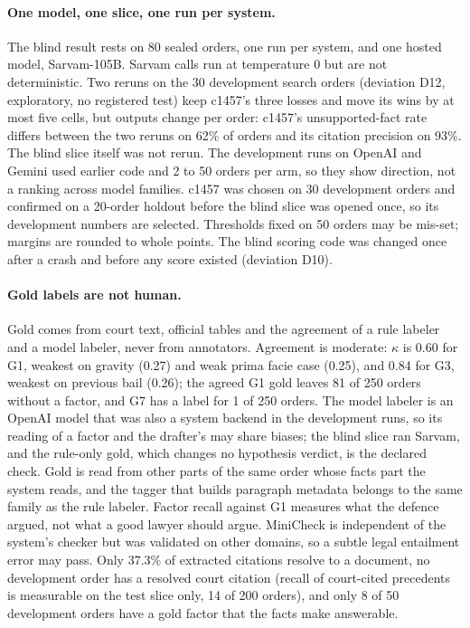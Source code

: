 \paragraph{One model, one slice, one run per system.} The blind result rests on 80 sealed orders, one run per system, and one hosted model, Sarvam-105B. Sarvam calls run at temperature 0 but are not deterministic. Two reruns on the 30 development search orders (deviation D12, exploratory, no registered test) keep c1457's three losses and move its wins by at most five cells, but outputs change per order: c1457's unsupported-fact rate differs between the two reruns on 62\% of orders and its citation precision on 93\%. The blind slice itself was not rerun. The development runs on OpenAI and Gemini used earlier code and 2 to 50 orders per arm, so they show direction, not a ranking across model families. c1457 was chosen on 30 development orders and confirmed on a 20-order holdout before the blind slice was opened once, so its development numbers are selected. Thresholds fixed on 50 orders may be mis-set; margins are rounded to whole points. The blind scoring code was changed once after a crash and before any score existed (deviation D10).

\paragraph{Gold labels are not human.} Gold comes from court text, official tables and the agreement of a rule labeler and a model labeler, never from annotators. Agreement is moderate: $\kappa$ is 0.60 for G1, weakest on gravity (0.27) and weak prima facie case (0.25), and 0.84 for G3, weakest on previous bail (0.26); the agreed G1 gold leaves 81 of 250 orders without a factor, and G7 has a label for 1 of 250 orders. The model labeler is an OpenAI model that was also a system backend in the development runs, so its reading of a factor and the drafter's may share biases; the blind slice ran Sarvam, and the rule-only gold, which changes no hypothesis verdict, is the declared check. Gold is read from other parts of the same order whose facts part the system reads, and the tagger that builds paragraph metadata belongs to the same family as the rule labeler. Factor recall against G1 measures what the defence argued, not what a good lawyer should argue. MiniCheck is independent of the system's checker but was validated on other domains, so a subtle legal entailment error may pass. Only 37.3\% of extracted citations resolve to a document, no development order has a resolved court citation (recall of court-cited precedents is measurable on the test slice only, 14 of 200 orders), and only 8 of 50 development orders have a gold factor that the facts make answerable.

